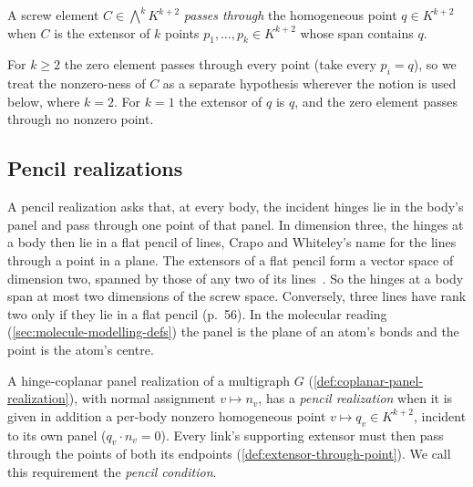 \begin{definition}
  \label{def:extensor-through-point}
  \leanok
  A screw element $C \in \bigwedge^{k} K^{k+2}$ \emph{passes through}
  the homogeneous point $q \in K^{k+2}$ when $C$ is the extensor of $k$
  points $p_1, \dots, p_k \in K^{k+2}$ whose span contains $q$.
\end{definition}

For $k \ge 2$ the zero element passes through every point (take every
$p_i = q$), so we treat the nonzero-ness of $C$ as a separate
hypothesis wherever the notion is used below, where $k = 2$. For
$k = 1$ the extensor of $q$ is $q$, and the zero element passes through
no nonzero point.

\subsection{Pencil realizations}
\label{sec:pencil-realization}

A pencil realization asks that, at every body, the incident hinges lie
in the body's panel and pass through one point of that panel. In
dimension three, the hinges at a body then lie in a flat pencil of
lines, Crapo and Whiteley's name for the lines through a point in a
plane. The extensors of a flat pencil form a vector space of dimension
two, spanned by those of any two of its
lines~\cite[\S3.5, p.~67]{crapoWhiteley1982}. So the hinges at a body
span at most two dimensions of the screw space. Conversely, three lines
have rank two only if they lie in a flat pencil (p.~56). In the
molecular reading
(\cref{sec:molecule-modelling-defs}) the panel is the plane of an atom's
bonds and the point is the atom's centre.

\begin{definition}
  \label{def:pencil-panel-realization}
  \leanok
  A hinge-coplanar panel realization of a multigraph $G$
  (\cref{def:coplanar-panel-realization}), with normal assignment $v
  \mapsto n_v$, has a \emph{pencil realization} when it is given in
  addition a per-body nonzero homogeneous point $v \mapsto q_v \in
  K^{k+2}$, incident to its own panel ($q_v \cdot n_v = 0$). Every
  link's supporting extensor must then pass through the points of both
  its endpoints (\cref{def:extensor-through-point}). We call this
  requirement the \emph{pencil condition}.
\end{definition}


